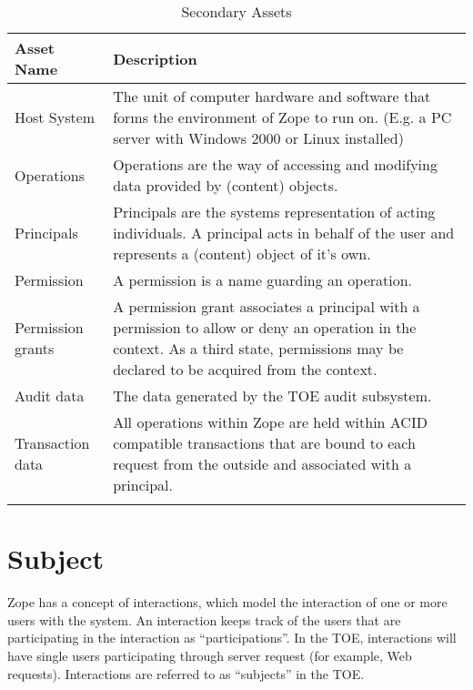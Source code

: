 \documentclass[12pt,english]{scrbook}
\begin{document}
\begin{longtable}[c]{lp{10cm}}
  \toprule 
  Asset Name & Description \\
  \midrule\endhead
  Host System
   & 
  The unit of computer hardware and software that
  forms the environment of Zope to run on. (E.g.
  a PC server with Windows 2000 or Linux installed)
   \\

  Operations
   & 
  Operations are the way of accessing and modifying
  data provided by (content) objects.
   \\

  Principals
   & 
  Principals are the systems representation of acting
  individuals. A principal acts in behalf of the user
  and represents a (content) object of it's own.
   \\

  Permission
   & 
  A permission is a name guarding an operation.
   \\

  Permission grants
   & 
  A permission grant associates a principal with a
  permission to allow or deny an operation in the context.
  As a third state, permissions may be declared to
  be acquired from the context.
   \\

  Audit data
   & 
  The data generated by the TOE audit subsystem.
   \\

  Transaction data
   & 
  All operations within Zope are held within ACID
  compatible transactions that are bound to each
  request from the outside and associated with a
  principal.
  \\
  \bottomrule
  \caption{Secondary Assets}
  \label{tab-sec-assets}

\end{longtable}



\section{Subject}

Zope has a concept of interactions, which model the interaction of one
or more users with the system.  An interaction keeps track of the
users that are participating in the interaction as ``participations''.
In the TOE, interactions will have single users participating through
server request (for example, Web requests).  Interactions are referred
to as ``subjects'' in the TOE.
\end{document}
